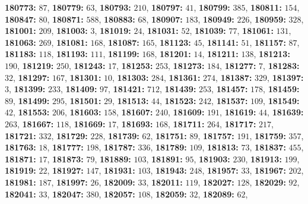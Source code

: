 \textsf{\bfseries 180773:} $87$, \textsf{\bfseries 180779:} $63$, \textsf{\bfseries 180793:} $210$, \textsf{\bfseries 180797:} $41$, \textsf{\bfseries 180799:} $385$, \textsf{\bfseries 180811:} $154$, \textsf{\bfseries 180847:} $80$, \textsf{\bfseries 180871:} $588$, \textsf{\bfseries 180883:} $68$, \textsf{\bfseries 180907:} $183$, \textsf{\bfseries 180949:} $226$, \textsf{\bfseries 180959:} $328$, \textsf{\bfseries 181001:} $209$, \textsf{\bfseries 181003:} $3$, \textsf{\bfseries 181019:} $24$, \textsf{\bfseries 181031:} $52$, \textsf{\bfseries 181039:} $77$, \textsf{\bfseries 181061:} $131$, \textsf{\bfseries 181063:} $269$, \textsf{\bfseries 181081:} $168$, \textsf{\bfseries 181087:} $165$, \textsf{\bfseries 181123:} $45$, \textsf{\bfseries 181141:} $51$, \textsf{\bfseries 181157:} $87$, \textsf{\bfseries 181183:} $118$, \textsf{\bfseries 181193:} $111$, \textsf{\bfseries 181199:} $168$, \textsf{\bfseries 181201:} $14$, \textsf{\bfseries 181211:} $138$, \textsf{\bfseries 181213:} $190$, \textsf{\bfseries 181219:} $250$, \textsf{\bfseries 181243:} $17$, \textsf{\bfseries 181253:} $253$, \textsf{\bfseries 181273:} $184$, \textsf{\bfseries 181277:} $7$, \textsf{\bfseries 181283:} $32$, \textsf{\bfseries 181297:} $167$, \textsf{\bfseries 181301:} $10$, \textsf{\bfseries 181303:} $284$, \textsf{\bfseries 181361:} $274$, \textsf{\bfseries 181387:} $329$, \textsf{\bfseries 181397:} $3$, \textsf{\bfseries 181399:} $233$, \textsf{\bfseries 181409:} $97$, \textsf{\bfseries 181421:} $712$, \textsf{\bfseries 181439:} $253$, \textsf{\bfseries 181457:} $178$, \textsf{\bfseries 181459:} $89$, \textsf{\bfseries 181499:} $295$, \textsf{\bfseries 181501:} $29$, \textsf{\bfseries 181513:} $44$, \textsf{\bfseries 181523:} $242$, \textsf{\bfseries 181537:} $109$, \textsf{\bfseries 181549:} $42$, \textsf{\bfseries 181553:} $206$, \textsf{\bfseries 181603:} $158$, \textsf{\bfseries 181607:} $240$, \textsf{\bfseries 181609:} $191$, \textsf{\bfseries 181619:} $44$, \textsf{\bfseries 181639:} $263$, \textsf{\bfseries 181667:} $118$, \textsf{\bfseries 181669:} $17$, \textsf{\bfseries 181693:} $168$, \textsf{\bfseries 181711:} $264$, \textsf{\bfseries 181717:} $217$, \textsf{\bfseries 181721:} $332$, \textsf{\bfseries 181729:} $228$, \textsf{\bfseries 181739:} $62$, \textsf{\bfseries 181751:} $89$, \textsf{\bfseries 181757:} $191$, \textsf{\bfseries 181759:} $357$, \textsf{\bfseries 181763:} $18$, \textsf{\bfseries 181777:} $198$, \textsf{\bfseries 181787:} $336$, \textsf{\bfseries 181789:} $109$, \textsf{\bfseries 181813:} $73$, \textsf{\bfseries 181837:} $455$, \textsf{\bfseries 181871:} $17$, \textsf{\bfseries 181873:} $79$, \textsf{\bfseries 181889:} $103$, \textsf{\bfseries 181891:} $95$, \textsf{\bfseries 181903:} $230$, \textsf{\bfseries 181913:} $199$, \textsf{\bfseries 181919:} $22$, \textsf{\bfseries 181927:} $147$, \textsf{\bfseries 181931:} $103$, \textsf{\bfseries 181943:} $248$, \textsf{\bfseries 181957:} $33$, \textsf{\bfseries 181967:} $202$, \textsf{\bfseries 181981:} $187$, \textsf{\bfseries 181997:} $26$, \textsf{\bfseries 182009:} $33$, \textsf{\bfseries 182011:} $119$, \textsf{\bfseries 182027:} $128$, \textsf{\bfseries 182029:} $92$, \textsf{\bfseries 182041:} $33$, \textsf{\bfseries 182047:} $380$, \textsf{\bfseries 182057:} $108$, \textsf{\bfseries 182059:} $32$, \textsf{\bfseries 182089:} $62$, 
